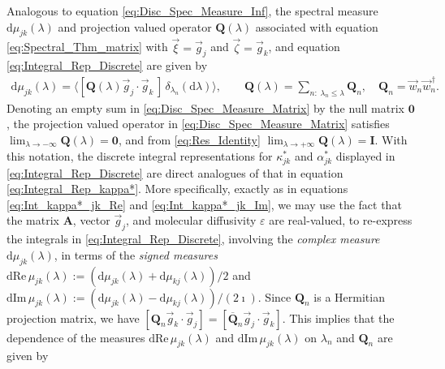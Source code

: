 \documentclass[11pt]{amsart}
\renewcommand{\d}{\mathrm{d}}
\newcommand{\Ib}{\mathbf{I}}
\newcommand{\Ab}{\mathbf{A}}
\newcommand{\Qb}{\mathbf{Q}}
\newcommand{\Ob}{\mathbf{0}}
\begin{document}
Analogous to equation \eqref{eq:Disc_Spec_Measure_Inf}, the
spectral measure $\d\mu_{jk}(\lambda)$ and projection valued operator $\Qb(\lambda)$
associated with equation \eqref{eq:Spectral_Thm_matrix} with
$\vec{\xi}=\vec{g}_j$ and $\vec{\zeta}=\vec{g}_k$, and equation
\eqref{eq:Integral_Rep_Discrete} are given by 
% 
\begin{align}\label{eq:Disc_Spec_Measure_Matrix}
  \d\mu_{jk}(\lambda)=\langle[\Qb(\lambda)\vec{g}_j\cdot\vec{g}_k\,]\,\delta_{\lambda_n}(\d\lambda)\rangle,\qquad
  \Qb(\lambda)=\sum_{n:\;\lambda_n\leq\lambda}\Qb_n, \quad
  \Qb_n=\vec{w}_n\vec{w}_n^{\,\dagger}.
\end{align}
%
Denoting an empty sum in \eqref{eq:Disc_Spec_Measure_Matrix} by the
null matrix $\Ob$, the projection valued operator in
\eqref{eq:Disc_Spec_Measure_Matrix} satisfies $\lim_{\lambda\to-\infty}\Qb(\lambda)=\Ob$,
and from \eqref{eq:Res_Identity} $\lim_{\lambda\to+\infty}\Qb(\lambda)=\Ib$. With this
notation, the discrete integral representations for $\kappa^*_{jk}$ and $\alpha^*_{jk}$
displayed in \eqref{eq:Integral_Rep_Discrete} are direct analogues of
that in equation \eqref{eq:Integral_Rep_kappa*}.   
More specifically, exactly as in equations \eqref{eq:Int_kappa*_jk_Re}
and \eqref{eq:Int_kappa*_jk_Im}, we may use the fact that the matrix
$\Ab$, vector $\vec{g}_j$, and molecular diffusivity $\varepsilon$ are
real-valued, to re-express the integrals in
\eqref{eq:Integral_Rep_Discrete}, involving the \emph{complex
  measure} $\d\mu_{jk}(\lambda)$, in terms of the \emph{signed measures}  
$\d\text{Re}\,\mu_{jk}(\lambda):=(\d\mu_{jk}(\lambda)+\d\mu_{kj}(\lambda))/2$ and
$\d\text{Im}\,\mu_{jk}(\lambda):=(\d\mu_{jk}(\lambda)-\d\mu_{kj}(\lambda))/(2\imath)$. Since
$\Qb_n$ is a Hermitian projection matrix, we have
$[\Qb_n\vec{g}_k\cdot\vec{g}_j]=[\overline{\Qb}_n\vec{g}_j\cdot\vec{g}_k]$. This
implies that the dependence of the measures 
$\d\text{Re}\,\mu_{jk}(\lambda)$ and $\d\text{Im}\,\mu_{jk}(\lambda)$ on $\lambda_n$ and
$\Qb_n$ are given by  
%
\end{document}
